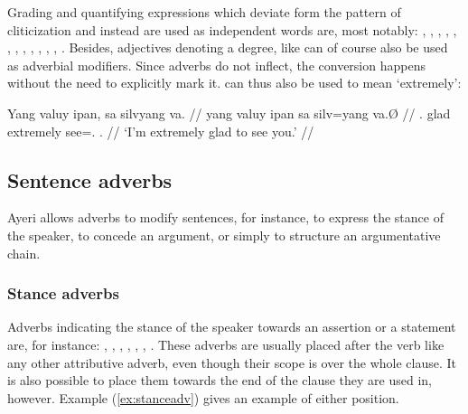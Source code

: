 Grading and quantifying expressions which deviate form the pattern of 
cliticization and instead are used as independent words are, most notably:
,
,
,
,
,
,
,
,
,
,
,
,
.
Besides, adjectives denoting a degree, like  can of course also be used as adverbial modifiers. Since adverbs do
not inflect, the conversion happens without the need to explicitly mark it.
 can thus also be used to mean `extremely':

\ex
\begingl
	\gla Yang valuy ipan, sa silvyang va. //
	\glb yang valuy ipan sa silv=yang va.Ø //
	\glc \Fsg{}.\Aarg{} glad extremely \PatT{} see=\Fsg{}.\Aarg{} 
		\Ssg{}.\Top{} //
	\glft `I'm extremely glad to see you.' //
\endgl
\xe


\subsection{Sentence adverbs}

Ayeri allows adverbs to modify sentences, for instance, to express the stance
of the speaker, to concede an argument, or simply to structure an argumentative
chain.

\subsubsection{Stance adverbs}

Adverbs indicating the stance of the speaker towards an assertion or a 
statement are, for instance:
, 
,
,
,
,
,
.
These adverbs are usually placed after the verb like any other attributive 
adverb, even though their scope is over the whole clause. It is also possible 
to place them towards the end of the clause they are used in, however. Example 
(\ref{ex:stanceadv}) gives an example of either position.

